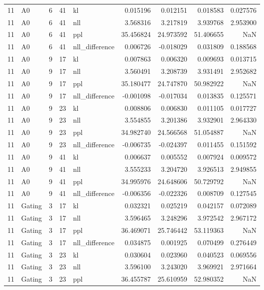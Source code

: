\begin{tabular}{rlrrlrrrr}
11 & A0 & 6 & 41 & kl & 0.015196 & 0.012151 & 0.018583 & 0.027576 \\
11 & A0 & 6 & 41 & nll & 3.568316 & 3.217819 & 3.939768 & 2.953900 \\
11 & A0 & 6 & 41 & ppl & 35.456824 & 24.973592 & 51.406655 & NaN \\
11 & A0 & 6 & 41 & nll_difference & 0.006726 & -0.018029 & 0.031809 & 0.188568 \\
11 & A0 & 9 & 17 & kl & 0.007863 & 0.006320 & 0.009693 & 0.013715 \\
11 & A0 & 9 & 17 & nll & 3.560491 & 3.208739 & 3.931491 & 2.952682 \\
11 & A0 & 9 & 17 & ppl & 35.180477 & 24.747870 & 50.982922 & NaN \\
11 & A0 & 9 & 17 & nll_difference & -0.001098 & -0.017034 & 0.013835 & 0.125571 \\
11 & A0 & 9 & 23 & kl & 0.008806 & 0.006830 & 0.011105 & 0.017727 \\
11 & A0 & 9 & 23 & nll & 3.554855 & 3.201386 & 3.932901 & 2.964330 \\
11 & A0 & 9 & 23 & ppl & 34.982740 & 24.566568 & 51.054887 & NaN \\
11 & A0 & 9 & 23 & nll_difference & -0.006735 & -0.024397 & 0.011455 & 0.151592 \\
11 & A0 & 9 & 41 & kl & 0.006637 & 0.005552 & 0.007924 & 0.009572 \\
11 & A0 & 9 & 41 & nll & 3.555233 & 3.204720 & 3.926513 & 2.949855 \\
11 & A0 & 9 & 41 & ppl & 34.995976 & 24.648606 & 50.729792 & NaN \\
11 & A0 & 9 & 41 & nll_difference & -0.006356 & -0.022326 & 0.008709 & 0.127545 \\
11 & Gating & 3 & 17 & kl & 0.032321 & 0.025219 & 0.042157 & 0.072089 \\
11 & Gating & 3 & 17 & nll & 3.596465 & 3.248296 & 3.972542 & 2.967172 \\
11 & Gating & 3 & 17 & ppl & 36.469071 & 25.746442 & 53.119363 & NaN \\
11 & Gating & 3 & 17 & nll_difference & 0.034875 & 0.001925 & 0.070499 & 0.276449 \\
11 & Gating & 3 & 23 & kl & 0.030604 & 0.023960 & 0.040523 & 0.069556 \\
11 & Gating & 3 & 23 & nll & 3.596100 & 3.243020 & 3.969921 & 2.971664 \\
11 & Gating & 3 & 23 & ppl & 36.455787 & 25.610959 & 52.980352 & NaN \\

\end{tabular}
